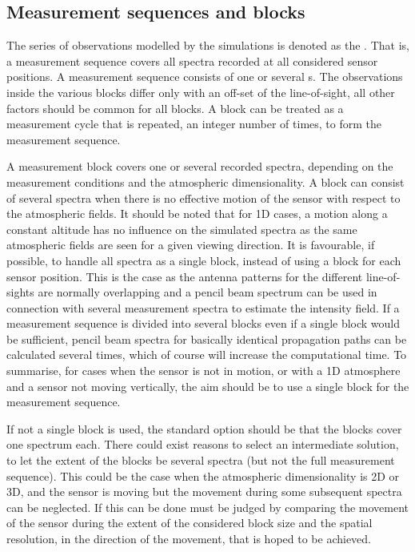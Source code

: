 \subsection{Measurement sequences and blocks}
\label{sec:fm_defs:seqsandblocks}

The series of observations modelled by the simulations is denoted as
the . That is, a measurement sequence
covers all spectra recorded at all considered sensor positions. A
measurement sequence consists of one or several s. The observations inside the various blocks differ only with
an off-set of the line-of-sight, all other factors should be common
for all blocks. A block can be treated as a measurement cycle that is
repeated, an integer number of times, to form the measurement
sequence. 

A measurement block covers one or several recorded spectra, depending
on the measurement conditions and the atmospheric dimensionality. A
block can consist of several spectra when there is no effective motion
of the sensor with respect to the atmospheric fields. It should be
noted that for 1D cases, a motion along a constant altitude has no
influence on the simulated spectra as the same atmospheric fields are
seen for a given viewing direction. It is favourable, if possible, to
handle all spectra as a single block, instead of using a block for
each sensor position. This is the case as the antenna patterns for the
different line-of-sights are normally overlapping and a pencil beam
spectrum can be used in connection with several measurement spectra to
estimate the intensity field. If a measurement sequence is divided
into several blocks even if a single block would be sufficient, pencil
beam spectra for basically identical propagation paths can be
calculated several times, which of course will increase the
computational time. To summarise, for cases when the sensor is not in
motion, or with a 1D atmosphere and a sensor not moving vertically,
the aim should be to use a single block for the measurement sequence.

If not a single block is used, the standard option should be that the
blocks cover one spectrum each. There could exist reasons to select an
intermediate solution, to let the extent of the blocks be several
spectra (but not the full measurement sequence). This could be the
case when the atmospheric dimensionality is 2D or 3D, and the sensor
is moving but the movement during some subsequent spectra can be
neglected. If this can be done must be judged by comparing the
movement of the sensor during the extent of the considered block size
and the spatial resolution, in the direction of the movement, that is
hoped to be achieved. 

